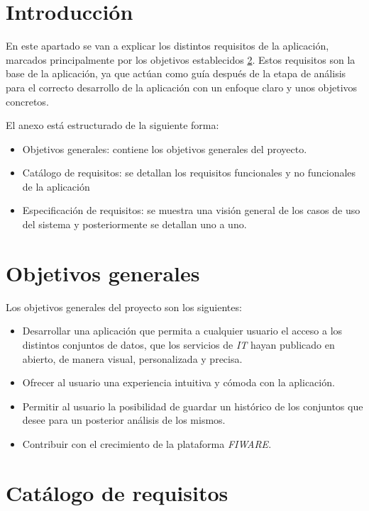 
\section{Introducción}

En este apartado se van a explicar los distintos requisitos de la aplicación, marcados principalmente por los objetivos establecidos \ref{objetivos-generales}.
Estos requisitos son la base de la aplicación, ya que actúan como guía después de la etapa de análisis para el correcto desarrollo de la aplicación con un enfoque claro y unos objetivos concretos.

El anexo está estructurado de la siguiente forma:
\begin{itemize}
    \item Objetivos generales: contiene los objetivos generales del proyecto.
    \item Catálogo de requisitos: se detallan los requisitos funcionales y no funcionales de la aplicación 
    \item Especificación de requisitos: se muestra una visión general de los casos de uso del sistema y posteriormente se detallan uno a uno.
\end{itemize}

\section{Objetivos generales}\label{objetivos-generales}

Los objetivos generales del proyecto son los siguientes:

\begin{itemize}
    \item Desarrollar una aplicación que permita a cualquier usuario el acceso a los distintos conjuntos de datos, que los servicios de \textit{IT} hayan publicado en abierto, de manera visual, personalizada y precisa.
    \item Ofrecer al usuario una experiencia intuitiva y cómoda con la aplicación.
    \item Permitir al usuario la posibilidad de guardar un histórico de los conjuntos que desee para un posterior análisis de los mismos.
    \item Contribuir con el crecimiento de la plataforma \textit{FIWARE}.

\end{itemize}

\section{Catálogo de requisitos}\label{catalogo-de-requisitos}

